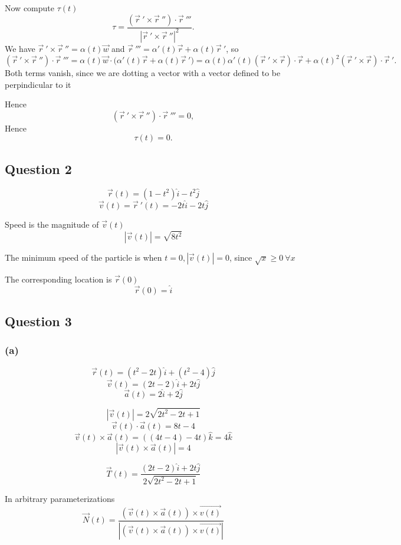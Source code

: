\documentclass{article}
\begin{document}
Now  compute $\tau(t)$ 
\[
\tau = \frac{(\vec{r}\ ' \times \vec{r}\ '') \cdot \vec{r}\ '''}{|\vec{r}\ ' \times \vec{r}\ ''|^2}.
\]
We have $\vec{r}\ ' \times \vec{r}\ '' = \alpha(t)\vec{w}$ and
$\vec{r}\ ''' = \alpha'(t)\vec{r} + \alpha(t)\vec{r}\ '$, so
\[
(\vec{r}\ ' \times \vec{r}\ '') \cdot \vec{r}\ '''
= \alpha(t)\vec{w} \cdot \bigl(\alpha'(t)\vec{r} + \alpha(t)\vec{r}\ '\bigr)
= \alpha(t)\alpha'(t)(\vec{r}\ ' \times \vec{r}) \cdot \vec{r}
+ \alpha(t)^2 (\vec{r}\ ' \times \vec{r}) \cdot \vec{r}\ '.
\]
Both terms vanish, since we are dotting a vector with a vector defined to be perpindicular
to it

Hence
\[
(\vec{r}\ ' \times \vec{r}\ '') \cdot \vec{r}\ ''' = 0,
\]
Hence
\[
\tau(t) = 0.
\]










\subsection*{Question 2}
\[
\vec{r}(t) = (1-t^2)\hat{i} - t^2 \hat{j}
\]
\[
\vec{v}(t) = \vec{r}\ '(t) = -2t\hat{i} - 2t\hat{j}
\]

Speed is the magnitude of \(\vec{v}(t)\)
\[
|\vec{v}(t)|  = \sqrt{8t^2}
\]

The minimum speed of the particle is when \(t = 0, |\vec{v}(t)| = 0\), 
since \(\sqrt{x} \geq 0 \ \forall x\)

The corresponding location is \(\vec{r}(0)\)
\[
\vec{r}(0) = \hat{i}
\]

\subsection*{Question 3}
\subsubsection*{(a)}
\[
\vec{r}(t) = (t^2 - 2t)\hat{i} + (t^2 - 4)\hat{j}
\]
\[
\vec{v}(t) = (2t-2)\hat{i} + 2t \hat{j}
\]
\[
\vec{a}(t) = 2\hat{i} + 2\hat{j}
\]

\[
|\vec{v}(t)| = 2\sqrt{2t^2 - 2t +1}
\]
\[
\vec{v}(t) \cdot \vec{a}(t) = 8t-4
\]
\[
\vec{v}(t) \times \vec{a}(t) = ((4t-4) - 4t)\hat{k} = 4\hat{k}
\]
\[
|\vec{v}(t) \times \vec{a}(t)| = 4
\]

\[
\vec{T}(t) = \frac{(2t-2)\hat{i} + 2t \hat{j}}{2\sqrt{2t^2 - 2t +1}}
\]

In arbitrary parameterizations
\[
\vec{N}(t) = \frac{(\vec{v}(t) \times \vec{a}(t))\times \vec{v(t)}}{|(\vec{v}(t) \times \vec{a}(t))\times \vec{v(t)}|}
\]
\end{document}

